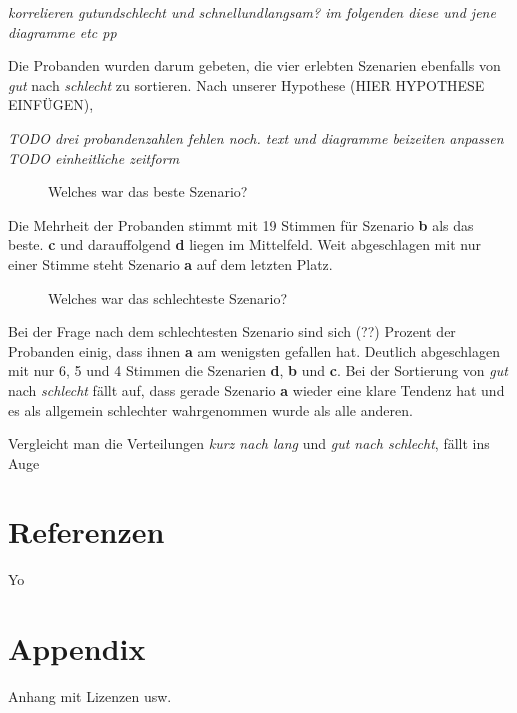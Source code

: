 \documentclass{Paper}
\begin{document}
	
	
	
\textit{korrelieren gutundschlecht und schnellundlangsam? im folgenden diese und jene diagramme etc pp}


	
	
	Die Probanden wurden darum gebeten, die vier erlebten Szenarien ebenfalls von \textit{gut} nach \textit{schlecht} zu sortieren. Nach unserer Hypothese (HIER HYPOTHESE EINFÜGEN),  


\textit{TODO drei probandenzahlen fehlen noch. text und diagramme beizeiten anpassen\\
TODO einheitliche zeitform}

	\begin{figure}[ht]
\caption{Welches war das beste Szenario?}
\end{figure}

Die Mehrheit der Probanden stimmt mit 19 Stimmen für Szenario \textbf{b} als das beste. \textbf{c} und darauffolgend \textbf{d} liegen im Mittelfeld. Weit abgeschlagen mit nur einer Stimme steht Szenario \textbf{a} auf dem letzten Platz.
	
	
	\begin{figure}[ht]
\caption{Welches war das schlechteste Szenario?}
\end{figure}
	

Bei der Frage nach dem schlechtesten Szenario sind sich (??) Prozent der Probanden einig, dass ihnen \textbf{a} am wenigsten gefallen hat. Deutlich abgeschlagen mit nur 6, 5 und 4 Stimmen die Szenarien \textbf{d}, \textbf{b} und \textbf{c}. 
Bei der Sortierung von \textit{gut} nach \textit{schlecht} fällt auf, dass gerade Szenario \textbf{a} wieder eine klare Tendenz hat und es als allgemein schlechter wahrgenommen wurde als alle anderen. 


Vergleicht man die Verteilungen \textit{kurz nach lang} und \textit{gut nach schlecht}, fällt ins Auge	

\section{Referenzen}
	Yo
	
\section{Appendix} %
	Anhang mit Lizenzen usw.
	
\vfill %

\printbibliography
\end{document}
